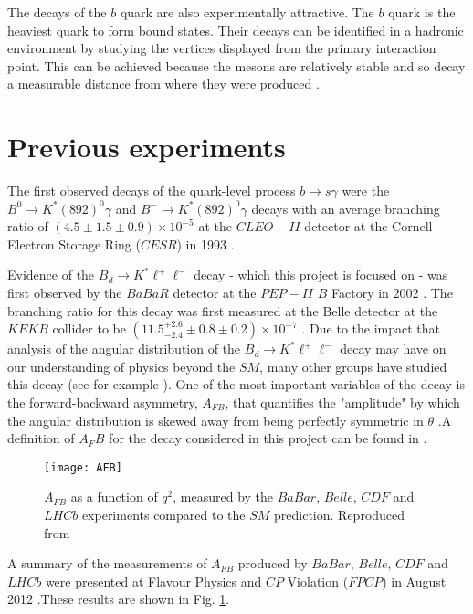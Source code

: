 \documentclass[a4paper,12pt]{article}
\begin{document}
The decays of the $b$ quark are also experimentally attractive. The $b$ quark is the heaviest quark to form bound states. Their decays can be identified in a hadronic environment by studying the vertices displayed from the primary interaction point. This can be achieved because the mesons are relatively stable and so decay a measurable distance from where they were produced \cite[p. 21]{paper1}.


\section{Previous experiments}\label{previousexperiments}
The first observed decays of the quark-level process $b \rightarrow s\gamma$ were the $B^0\rightarrow K^{\ast}(892)^0\gamma$ and $B^-\rightarrow K^{\ast}(892)^0\gamma$ decays with an average branching ratio of $(4.5 \pm1.5 \pm 0.9) \times 10^{-5}$ at the $CLEO-II$ detector at the Cornell Electron Storage Ring ($CESR$) in 1993 \cite{paper21}. 

Evidence of the $B_d \to K^{*} \ell^{+} \ell^{-}$ decay - which this project is focused on - was first observed by the $BaBaR$ detector at the $PEP-II$ $B$ Factory in 2002 \cite{paper34}. The branching ratio for this decay was first measured at  the Belle detector at the $KEKB$ collider to be $(11.5 ^{+2.6}_{-2.4}\pm 0.8\pm 0.2)\times 10^{-7}$ \cite{paper41}. Due to the impact that analysis of the angular distribution of the $B_d \to K^{*} \ell^{+} \ell^{-}$ decay may have on our understanding of physics beyond the $SM$, many other groups have studied this decay (see for example  \cite{paper40,paper42,paper43,paper44}). One of the most important variables of the decay is the forward-backward asymmetry, $A_{FB}$, that quantifies the "amplitude" by which the angular distribution is skewed away from being perfectly symmetric in $\theta$ \cite[p. 8]{barker}.A definition of $A_FB$ for the decay considered in this project can be found in \cite[p. 55]{paper1}. 
\begin{figure}
\begin{center}
\texttt{[image: AFB]}
\end{center}
\caption{$A_{FB}$ as a function of $q^2$, measured by the $BaBar$, $Belle$, $CDF$ and $LHCb$ experiments compared to the $SM$ prediction. Reproduced from \cite{paper40}}
\label{figure3}
\end{figure}
A summary of the measurements of $A_{FB}$ produced by $BaBar$, $Belle$, $CDF$ and $LHCb$ were presented at Flavour Physics and $CP$ Violation ($FPCP$) in August 2012 \cite{paper40}.These results are shown in Fig. \ref{figure3}. 
 
\end{document}
